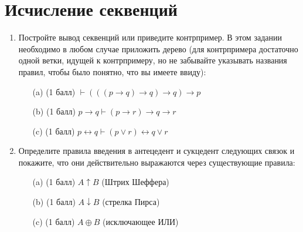 \section{Исчисление секвенций}
\begin{enumerate}
  \item Постройте вывод секвенций или приведите контрпример. В этом задании необходимо в
  любом случае приложить дерево (для контрпримера достаточно одной ветки, идущей к
  контрпримеру, но не забывайте указывать названия правил, чтобы было понятно, что
  вы имеете ввиду):
  \begin{itemize}
    \item[(a)] (1 балл) $\vdash (((p \rightarrow q) \rightarrow q) \rightarrow q) \rightarrow p$
    \item[(b)] (1 балл) $p \rightarrow q \vdash (p \rightarrow r) \rightarrow q \rightarrow r$
    \item[(c)] (1 балл) $p \leftrightarrow q \vdash (p \lor r) \leftrightarrow q \lor r$
  \end{itemize}
  \item Определите правила введения в антецедент и сукцедент следующих связок и покажите,
  что они действительно выражаются через существующие правила:
  \begin{itemize}
    \item[(a)] (1 балл) $A \uparrow B$ (Штрих Шеффера)
    \item[(b)] (1 балл) $A \downarrow B$ (стрелка Пирса) 
    \item[(c)] (1 балл) $A \oplus B$ (исключающее ИЛИ) 
  \end{itemize}
\end{enumerate}
\clearpage
